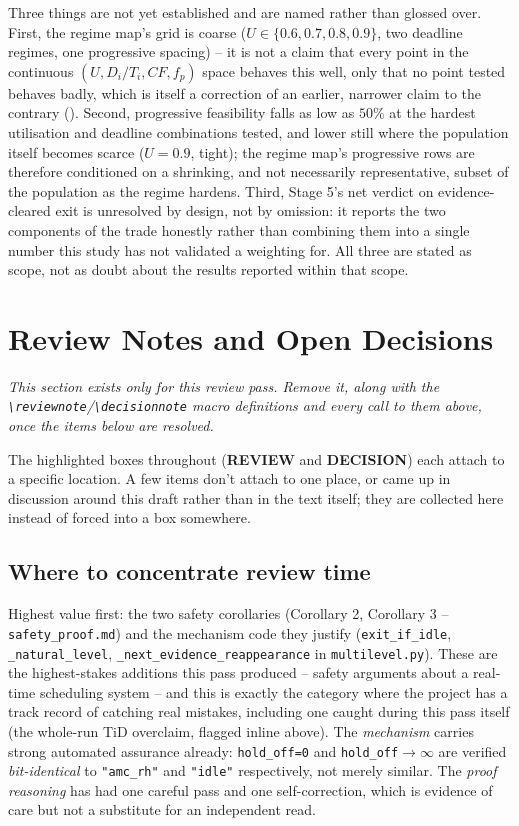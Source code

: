 \documentclass{article}
\begin{document}
Three things are not yet established and are named rather than glossed over.
First, the regime map's grid is coarse ($U \in \{0.6,0.7,0.8,0.9\}$, two
deadline regimes, one progressive spacing) -- it is not a claim that every
point in the continuous $(U, D_i/T_i, CF, f_p)$ space behaves this well, only
that no point tested behaves badly, which is itself a correction of an earlier,
narrower claim to the contrary (). Second,
progressive feasibility falls as low as $50\%$ at the hardest utilisation and
deadline combinations tested, and lower still where the population itself
becomes scarce ($U=0.9$, tight); the regime map's progressive rows are
therefore conditioned on a shrinking, and not necessarily representative,
subset of the population as the regime hardens. Third, Stage 5's net verdict
on evidence-cleared exit is unresolved by design, not by omission: it reports
the two components of the trade honestly rather than combining them into a
single number this study has not validated a weighting for. All three are
stated as scope, not as doubt about the results reported within that scope.

\section{Review Notes and Open Decisions}
\label{sec:review-notes}

\textit{This section exists only for this review pass. Remove it, along with the
\texttt{\textbackslash reviewnote}/\texttt{\textbackslash decisionnote} macro definitions and
every call to them above, once the items below are resolved.}

The highlighted boxes throughout 
(\textcolor{red!70!black}{\textbf{REVIEW}} and \textcolor{blue!60!black}{\textbf{DECISION}}) each
attach to a specific location. A few items don't attach to one place, or came up in discussion
around this draft rather than in the text itself; they are collected here instead of forced into
a box somewhere.

\subsection{Where to concentrate review time}

Highest value first: the two safety corollaries (Corollary 2, Corollary 3 --
\texttt{safety\_proof.md}) and the mechanism code they justify
(\texttt{exit\_if\_idle}, \texttt{\_natural\_level}, \texttt{\_next\_evidence\_reappearance} in
\texttt{multilevel.py}). These are the highest-stakes additions this pass produced -- safety
arguments about a real-time scheduling system -- and this is exactly the category where the
project has a track record of catching real mistakes, including one caught during this pass
itself (the whole-run TiD overclaim, flagged inline above). The \emph{mechanism} carries strong
automated assurance already: \texttt{hold\_off=0} and \texttt{hold\_off}$\to\infty$ are verified
\emph{bit-identical} to \texttt{"amc\_rh"} and \texttt{"idle"} respectively, not merely similar.
The \emph{proof reasoning} has had one careful pass and one self-correction, which is evidence of
care but not a substitute for an independent read.
\end{document}
